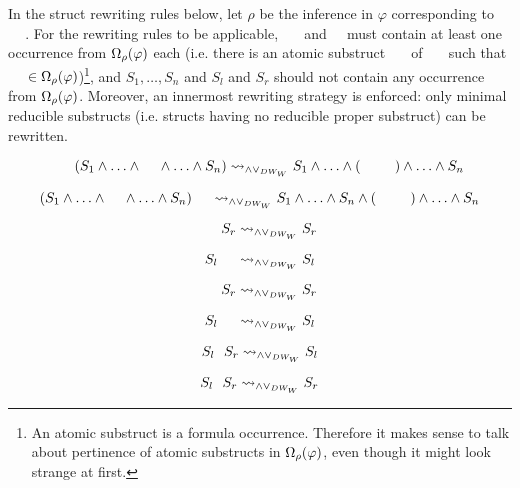 \documentclass{llncs}
\begin{document}
\begin{definition}[$\normalizePlusTimesDW$]
\label{definition:NormalizationPlusTimesDefinitionalSwap}

In the struct rewriting rules below, let $\rho$ be the inference in $\varphi$ corresponding to $\hF{\structtimes_{\rho}}$. For the rewriting rules to be applicable, $\hF{S_k}$ and $\hF{S}$ must contain at least one occurrence from $\Omega_{\rho}(\varphi)$ each (i.e. there is an atomic substruct $\hF{S'_{k}}$ of $\hF{S_{k}}$ such that $\hF{S'_{k}} \in \occInference{\varphi}{\rho}$)\footnote{
An atomic substruct is a formula occurrence. Therefore it makes sense to talk about pertinence of atomic substructs in $\Omega_{\rho}(\varphi)$, even though it might look strange at first.}, and $S_1, \ldots, S_n$ and $S_l$ and $S_r$ should not contain any occurrence from $\Omega_{\rho}(\varphi)$. Moreover, an innermost rewriting strategy is enforced: only minimal reducible substructs (i.e. structs having no reducible proper substruct) can be rewritten.

$$
\hF{S} \hF{\structtimes} (S_1 \structplus \ldots \structplus \hF{S_k} \structplus \ldots \structplus S_n) \normalizePlusTimesDWw  S_1 \structplus \ldots \structplus (\hF{S} \hF{\structtimes} \hF{S_{k}}) \structplus \ldots \structplus S_n
$$

$$
(S_1 \structplus \ldots \structplus \hF{S_k} \structplus \ldots \structplus S_n) \hF{\structtimes} \hF{S} \normalizePlusTimesDWw  S_1 \structplus \ldots \structplus S_n \structplus ( \hF{S_k} \hF{\structtimes} \hF{S}) \structplus \ldots \structplus S_n  
$$

\begin{multicols}{4}{

$$
\hF{S} \hF{\structtimes} S_r \normalizePlusTimesDWw  S_r
$$

$$
S_l \hF{\structtimes} \hF{S} \normalizePlusTimesDWw  S_l
$$

$$
\hF{S} \hF{\structplus} S_r \normalizePlusTimesDWw  S_r
$$

$$
S_l \hF{\structplus} \hF{S} \normalizePlusTimesDWw  S_l
$$

}\end{multicols}


\begin{multicols}{4}{

$$
S_l \hF{\structtimes} S_r \normalizePlusTimesDWw  S_l
$$

$$
S_l \hF{\structtimes} S_r \normalizePlusTimesDWw  S_r
$$

}
\end{multicols}
\end{definition}
\end{document}
